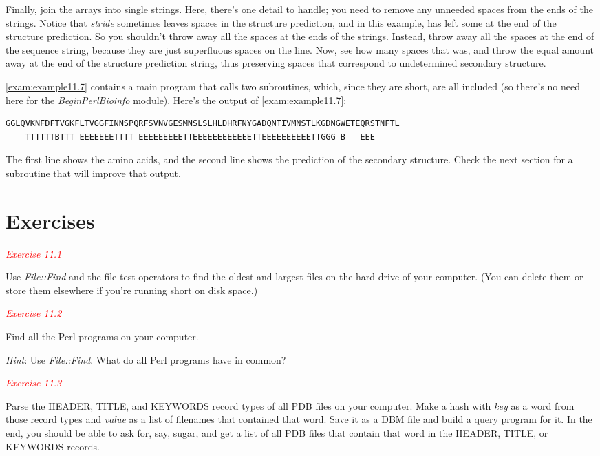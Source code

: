 Finally, join the arrays into single strings. Here, there's one detail to handle; you need to remove any unneeded spaces from the ends of the strings. Notice that \textit{stride} sometimes leaves spaces in the structure prediction, and in this example, has left some at the end of the structure prediction. So you shouldn't throw away all the spaces at the ends of the strings. Instead, throw away all the spaces at the end of the sequence string, because they are just superfluous spaces on the line. Now, see how many spaces that was, and throw the equal amount away at the end of the structure prediction string, thus preserving spaces that correspond to undetermined secondary structure.

\autoref{exam:example11.7} contains a main program that calls two subroutines, which, since they are short, are all included (so there's no need here for the \textit{BeginPerlBioinfo} module). Here's the output of \autoref{exam:example11.7}: 

\begin{lstlisting}
GGLQVKNFDFTVGKFLTVGGFINNSPQRFSVNVGESMNSLSLHLDHRFNYGADQNTIVMNSTLKGDNGWETEQRSTNFTL
    TTTTTTBTTT EEEEEEETTTT EEEEEEEEETTEEEEEEEEEEEETTEEEEEEEEEETTGGG B   EEE     
\end{lstlisting}

The first line shows the amino acids, and the second line shows the prediction of the secondary structure. Check the next section for a subroutine that will improve that output. 

\section{Exercises}
\textcolor{red}{\textit{Exercise 11.1}}
\begin{adjustwidth}{2em}{}
Use \textit{File::Find} and the file test operators to find the oldest and largest files on the hard drive of your computer. (You can delete them or store them elsewhere if you're running short on disk space.)
\end{adjustwidth}

\textcolor{red}{\textit{Exercise 11.2}}
\begin{adjustwidth}{2em}{}
Find all the Perl programs on your computer.

\textit{Hint}: Use \textit{File::Find}. What do all Perl programs have in common?
\end{adjustwidth}

\textcolor{red}{\textit{Exercise 11.3}}
\begin{adjustwidth}{2em}{}
Parse the HEADER, TITLE, and KEYWORDS record types of all PDB files on your computer. Make a hash with \textit{key} as a word from those record types and \textit{value} as a list of filenames that contained that word. Save it as a DBM file and build a query program for it. In the end, you should be able to ask for, say, sugar, and get a list of all PDB files that contain that word in the HEADER, TITLE, or KEYWORDS records.
\end{adjustwidth}


